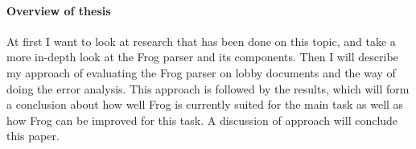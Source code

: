 \paragraph{Overview of thesis}
At first I want to look at research that has been done on this topic, and take a more in-depth look at the Frog parser and its components. Then I will describe my approach of evaluating the Frog parser on lobby documents and the way of doing the error analysis. This approach is followed by the results, which will form a conclusion about how well Frog is currently suited for the main task as well as how Frog can be improved for this task. A discussion of approach will conclude this paper.

